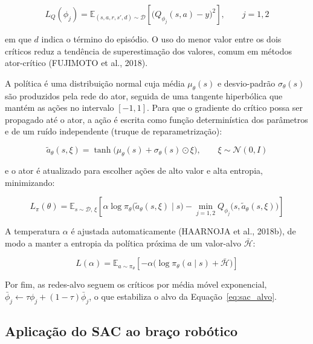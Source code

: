 \begin{equation}
    L_Q(\phi_j) = \mathbb{E}_{(s, a, r, s', d) \sim \mathcal{D}} \left[ \big( Q_{\phi_j}(s, a) - y \big)^2 \right], \qquad j = 1, 2
    \label{eq:sac_critico}
\end{equation}

\noindent em que $d$ indica o término do episódio. O uso do menor valor entre os dois críticos reduz a tendência de superestimação dos valores, comum em métodos ator-crítico (FUJIMOTO et al., 2018).

A política é uma distribuição normal cuja média $\mu_\theta(s)$ e desvio-padrão $\sigma_\theta(s)$ são produzidos pela rede do ator, seguida de uma tangente hiperbólica que mantém as ações no intervalo $[-1, 1]$. Para que o gradiente do crítico possa ser propagado até o ator, a ação é escrita como função determinística dos parâmetros e de um ruído independente (truque de reparametrização):

\begin{equation}
    \tilde{a}_\theta(s, \xi) = \tanh\big( \mu_\theta(s) + \sigma_\theta(s) \odot \xi \big), \qquad \xi \sim \mathcal{N}(0, I)
    \label{eq:sac_reparam}
\end{equation}

\noindent e o ator é atualizado para escolher ações de alto valor e alta entropia, minimizando:

\begin{equation}
    L_\pi(\theta) = \mathbb{E}_{s \sim \mathcal{D},\, \xi} \left[ \alpha \log \pi_\theta\big(\tilde{a}_\theta(s, \xi) \mid s\big) - \min_{j=1,2} Q_{\phi_j}\big(s, \tilde{a}_\theta(s, \xi)\big) \right]
    \label{eq:sac_ator}
\end{equation}

A temperatura $\alpha$ é ajustada automaticamente (HAARNOJA et al., 2018b), de modo a manter a entropia da política próxima de um valor-alvo $\bar{\mathcal{H}}$:

\begin{equation}
    L(\alpha) = \mathbb{E}_{a \sim \pi_\theta} \left[ -\alpha \big( \log \pi_\theta(a \mid s) + \bar{\mathcal{H}} \big) \right]
    \label{eq:sac_alpha}
\end{equation}

\noindent Por fim, as redes-alvo seguem os críticos por média móvel exponencial, $\bar{\phi}_j \leftarrow \tau \phi_j + (1 - \tau) \bar{\phi}_j$, o que estabiliza o alvo da Equação~\ref{eq:sac_alvo}.

\subsection{Aplicação do SAC ao braço robótico}

